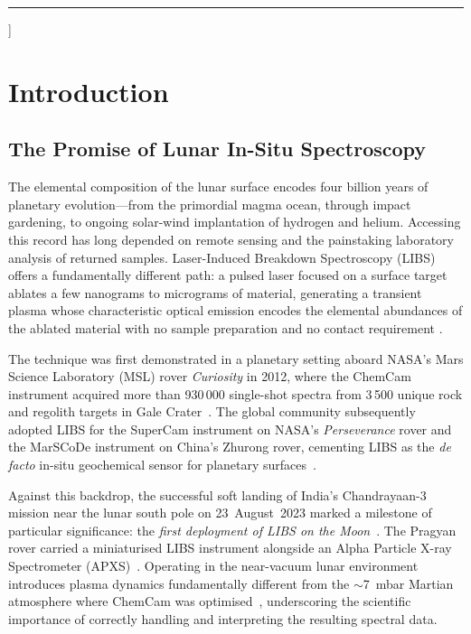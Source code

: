 \documentclass[a4paper,twocolumn,10pt]{article}
\begin{document}
{\begin{@twocolumnfalse}
\vspace{10pt}\hrule\vspace{12pt}
\end{@twocolumnfalse}
}]

\linenumbers

\section{Introduction}
\label{sec:intro}

\subsection{The Promise of Lunar In-Situ Spectroscopy}

The elemental composition of the lunar surface encodes four billion
years of planetary evolution---from the primordial magma ocean, through
impact gardening, to ongoing solar-wind implantation of hydrogen and
helium.  Accessing this record has long depended on remote sensing and
the painstaking laboratory analysis of returned samples.  Laser-Induced
Breakdown Spectroscopy (LIBS) offers a fundamentally different path: a
pulsed laser focused on a surface target ablates a few nanograms to
micrograms of material, generating a transient plasma whose
characteristic optical emission encodes the elemental abundances of the
ablated material with no sample preparation and no contact requirement
\cite{Cremers2006,Wiens2012}.

The technique was first demonstrated in a planetary setting aboard
NASA's Mars Science Laboratory (MSL) rover \emph{Curiosity} in 2012,
where the ChemCam instrument acquired more than 930\,000 single-shot
spectra from 3\,500 unique rock and regolith targets in Gale
Crater~\cite{Wiens2012,Maurice2012,Gasnault2023}.  The global
community subsequently adopted LIBS for the SuperCam instrument on
NASA's \emph{Perseverance} rover and the MarSCoDe instrument on
China's Zhurong rover, cementing LIBS as the \emph{de facto} in-situ
geochemical sensor for planetary surfaces~\cite{Wiens2020,Xu2021}.

Against this backdrop, the successful soft landing of India's
Chandrayaan-3 mission near the lunar south pole on 23~August~2023
marked a milestone of particular significance: the \emph{first
deployment of LIBS on the Moon}~\cite{ISROCh3}.  The Pragyan rover
carried a miniaturised LIBS instrument alongside an Alpha Particle
X-ray Spectrometer (APXS)~\cite{Laxmiprasad2020}.  Operating in the
near-vacuum lunar environment introduces plasma dynamics fundamentally
different from the $\sim$7~mbar Martian atmosphere where ChemCam was
optimised~\cite{Saeidfirozeh2024}, underscoring the scientific
importance of correctly handling and interpreting the resulting spectral
data.
\end{document}
